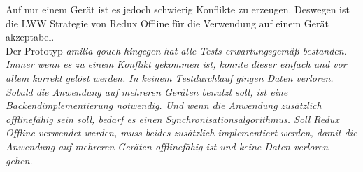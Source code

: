 Auf nur einem Gerät ist es jedoch schwierig Konflikte zu erzeugen. Deswegen ist die \gls{LWW} Strategie von Redux Offline für die Verwendung auf einem Gerät akzeptabel.\\
Der Prototyp \it{amilia-qouch} hingegen hat alle Tests erwartungsgemäß bestanden.
Immer wenn es zu einem Konflikt gekommen ist, konnte dieser einfach und vor allem korrekt gelöst werden.
In keinem Testdurchlauf gingen Daten verloren.\\
Sobald die Anwendung auf mehreren Geräten benutzt soll, ist eine Backendimplementierung notwendig.
Und wenn die Anwendung zusätzlich offlinefähig sein soll, bedarf es einen Synchronisationsalgorithmus.
Soll Redux Offline verwendet werden, muss beides zusätzlich implementiert werden, damit die Anwendung auf mehreren Geräten offlinefähig ist und keine Daten verloren gehen.
%